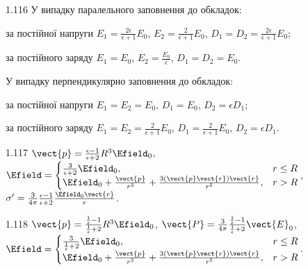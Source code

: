 \begin{Solution}{1.{116}}
		У випадку паралельного заповнення до обкладок:
		\begin{enumerate*}[label=\alph*)]
			\item за постійної напруги
			$E_1 = \frac{2\epsilon}{\epsilon + 1} E_0$, $E_2 = \frac{2}{\epsilon + 1} E_0$, $D_1 = D_2 = \frac{2\epsilon}{\epsilon + 1} E_0$;
			\item за постійного заряду
			$E_1 = E_0$, $E_2 = \frac{E_0}{\epsilon}$, $D_1 = D_2 = E_0$.
		\end{enumerate*}
		У випадку перпендикулярно заповнення до обкладок:
		\begin{enumerate*}[label=\alph*)]
			\item за постійної напруги
			$E_1 = E_2 = E_0$, $D_1 = E_0$, $D_2 = \epsilon D_1$;
			\item за постійного заряду
			$E_1 = E_2 = \frac{2}{\epsilon + 1} E_0$, $D_1 = \frac{2}{\epsilon + 1} E_0$, $D_2 = \epsilon D_1$.
		\end{enumerate*}
	
\end{Solution}
\begin{Solution}{1.{117}}
	$\vect{p} = \frac{\epsilon - 1}{\epsilon + 2}R^3\Efield_0$,
	$
		\Efield =
		\begin{cases}
			\frac{3}{\epsilon + 2} \Efield_0,                                                       & r \le R \\
			\Efield_0 + \frac{\vect{p}}{r^3} + \frac{3\left(\vect{p}\vect{r}\right)\vect{r} }{r^5}, & r > R
		\end{cases}
	$,
	$\sigma' = \frac{3}{4\pi} \frac{\epsilon - 1}{\epsilon + 2} \frac{\Efield_0\vect{r}}{r}$.
\end{Solution}
\begin{Solution}{1.{118}}
	$\vect{p} = \frac{\frac{1}{\epsilon} - 1}{\frac{1}{\epsilon} + 2}R^3\Efield_0$,
	$\vect{P} = \frac{3}{4\pi} \frac{\frac{1}{\epsilon} - 1}{\frac{1}{\epsilon} + 2} \vect{E}_0$,
	$
		\Efield =
		\begin{cases}
			\frac{3}{\frac{1}{\epsilon} + 2} \Efield_0,                                             & r \le R \\
			\Efield_0 + \frac{\vect{p}}{r^3} + \frac{3\left(\vect{p}\vect{r}\right)\vect{r} }{r^5}, & r > R
		\end{cases}
	$.
\end{Solution}
